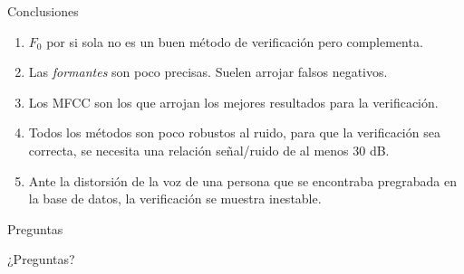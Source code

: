 \documentclass{beamer}
\begin{document}
\begin{frame}{Conclusiones}

\begin{block}{}
\begin{enumerate}
\item $F_{0}$ por si sola no es un buen método de verificación pero complementa.

\item Las \textit{formantes} son poco precisas. Suelen arrojar falsos negativos.

\item Los MFCC son los que arrojan los mejores resultados para la verificación.

\item Todos los métodos son poco robustos al ruido, para que la verificación sea correcta, se necesita una relación señal/ruido de al menos 30 dB.
 
\item Ante la distorsión de la voz de una persona que se encontraba pregrabada en la base de datos, la verificación se muestra inestable.
\end{enumerate}
\end{block}

\end{frame}

\begin{frame}{Preguntas}


\begin{block}{}
\begin{center}
{\Huge ¿Preguntas?}
\end{center}
\end{block}


\end{frame}
\end{document}
